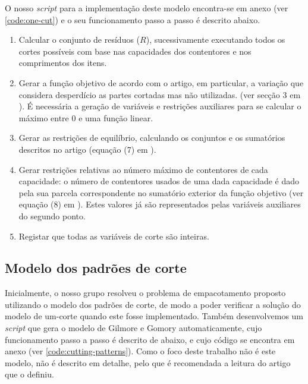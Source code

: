 \documentclass[12pt, a4paper, titlepage]{article}
\begin{document}
O nosso \emph{script} para a implementação deste modelo encontra-se em anexo (ver
\ref{code:one-cut}) e o seu funcionamento passo a passo é descrito abaixo.

\begin{enumerate}
    \item Calcular o conjunto de resíduos ($R$), sucessivamente executando todos os cortes possíveis
        com base nas capacidades dos contentores e nos comprimentos dos itens.

    \item Gerar a função objetivo de acordo com o artigo, em particular, a variação que considera
        desperdício as partes cortadas mas não utilizadas. (ver secção 3 em \cite{dyckhoff}). É
        necessária a geração de variáveis e restrições auxiliares para se calcular o máximo entre
        $0$ e uma função linear.

    \item Gerar as restrições de equilíbrio, calculando os conjuntos e os sumatórios descritos no
        artigo (equação (7) em \cite{dyckhoff}).

    \item Gerar restrições relativas ao número máximo de contentores de cada capacidade: o número
        de contentores usados de uma dada capacidade é dado pela sua parcela correspondente no
        sumatório exterior da função objetivo (ver equação (8) em \cite{dyckhoff}). Estes valores já
        são representados pelas variáveis auxiliares do segundo ponto.

    \item Registar que todas as variáveis de corte são inteiras.
\end{enumerate}

\subsection{Modelo dos padrões de corte}

Inicialmente, o nosso grupo resolveu o problema de empacotamento proposto utilizando o modelo dos
padrões de corte, de modo a poder verificar a solução do modelo de um-corte quando este fosse
implementado. Também desenvolvemos um \emph{script} que gera o modelo de Gilmore e Gomory
automaticamente, cujo funcionamento passo a passo é descrito de abaixo, e cujo código se encontra em
anexo (ver \ref{code:cutting-patterns}). Como o foco deste trabalho não é este modelo, não é
descrito em detalhe, pelo que é recomendada a leitura do artigo que o definiu.
\cite{gilmore-and-gomory}
\end{document}

